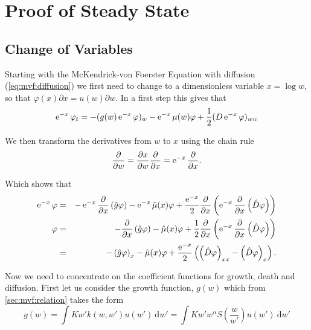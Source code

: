 \documentclass[../main.tex]{subfiles}
\begin{document}
  \chapter{Proof of Steady State}\label{app:chap:derivation}
  \section{Change of Variables}\label{app:sec:cov}
  Starting with the McKendrick-von Foerster Equation with diffusion (\autoref{eq:mvf:diffusion}) we first need to change to a dimensionless variable $x = \log{w}$, so that $\varphi(x) \partial x = u(w) \partial w$. In a first step this gives that
  \begin{equation}
    \operatorname{e}^{-x}\varphi_t = - (g(w) \operatorname{e}^{-x} \varphi)_w - \operatorname{e}^{-x} \mu(w) \varphi + \frac{1}{2}(D \operatorname{e}^{-x}\varphi)_{ww}
  \end{equation}

  We then transform the derivatives from $w$ to $x$ using the chain rule
  \begin{equation}
    \frac{\partial}{\partial w}
    = \frac{\partial x}{\partial w} \frac{\partial}{\partial x} = \operatorname{e}^{-x} \frac{\partial}{\partial x}.
  \end{equation}

  Which shows that
  \begin{eqnarray}
    \operatorname{e}^{-x}\varphi
    &=& -\operatorname{e}^{-x} \frac{\partial}{\partial x} \left(\hat{g} \varphi \right) - \operatorname{e}^{-x} \hat{\mu}(x) \varphi + \frac{\operatorname{e}^{-x}}{2} \frac{\partial}{\partial x} \left( \operatorname{e}^{-x} \frac{\partial}{\partial x} \left( \hat{D} \varphi \right) \right) \nonumber \\
    \varphi
    &=& - \frac{\partial}{\partial x} \left(\hat{g} \varphi \right) - \hat{\mu}(x) \varphi + \frac{1}{2} \frac{\partial}{\partial x} \left( \operatorname{e}^{-x} \frac{\partial}{\partial x} \left( \hat{D} \varphi \right) \right) \nonumber \\
    &=& - \left(\hat{g} \varphi \right)_x - \hat{\mu}(x) \varphi + \frac{\operatorname{e}^{-x}}{2} \left( \left( \hat{D} \varphi \right)_{xx} - \left( \hat{D} \varphi \right)_x \right). \label{app:eq:cov}
  \end{eqnarray}

  Now we need to concentrate on the coefficient functions for growth, death and diffusion. First let us consider the growth function, $g(w)$ which from \autoref{sec:mvf:relation} takes the form
  \begin{equation}
    g(w) = \int K w' k(w, w') u(w') \: \mathrm{d} w' = \int K w' w^{\alpha} S \left( \frac{w}{w'} \right) u(w') \: \mathrm{d} w'
  \end{equation}
\end{document}
